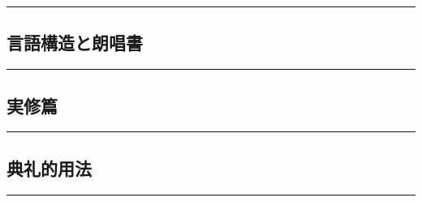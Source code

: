 \documentclass[
  japanese,
]{article}
\begin{document}
\begin{center}\rule{0.5\linewidth}{0.5pt}\end{center}

\subsection{言語構造と朗唱書}\label{chapter7}

\begin{center}\rule{0.5\linewidth}{0.5pt}\end{center}

\subsection{実修篇}\label{chapter8}

\begin{center}\rule{0.5\linewidth}{0.5pt}\end{center}

\subsection{典礼的用法}\label{chapter9}

\begin{center}\rule{0.5\linewidth}{0.5pt}\end{center}
\end{document}
